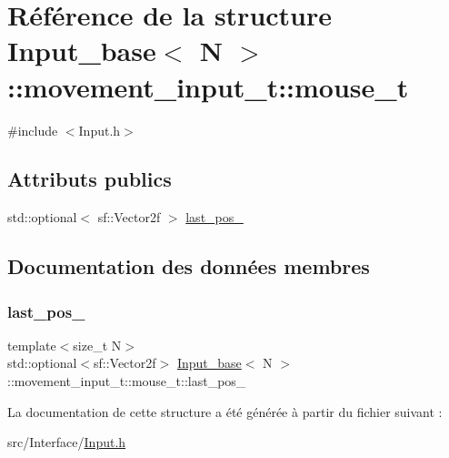 \hypertarget{struct_input__base_1_1movement__input__t_1_1mouse__t}{}\section{Référence de la structure Input\+\_\+base$<$ N $>$\+:\+:movement\+\_\+input\+\_\+t\+:\+:mouse\+\_\+t}
\label{struct_input__base_1_1movement__input__t_1_1mouse__t}


{\ttfamily \#include $<$Input.\+h$>$}

\subsection*{Attributs publics}
\begin{DoxyCompactItemize}
\item 
std\+::optional$<$ sf\+::\+Vector2f $>$ \hyperlink{struct_input__base_1_1movement__input__t_1_1mouse__t_abb22b79e3d13bb8333a5c826cca0888f}{last\+\_\+pos\+\_\+}
\end{DoxyCompactItemize}


\subsection{Documentation des données membres}
\mbox{\label{struct_input__base_1_1movement__input__t_1_1mouse__t_abb22b79e3d13bb8333a5c826cca0888f}} 
\subsubsection{\texorpdfstring{last\+\_\+pos\+\_\+}{last\_pos\_}}
{\footnotesize\ttfamily template$<$size\+\_\+t N$>$ \\
std\+::optional$<$sf\+::\+Vector2f$>$ \hyperlink{class_input__base}{Input\+\_\+base}$<$ N $>$\+::movement\+\_\+input\+\_\+t\+::mouse\+\_\+t\+::last\+\_\+pos\+\_\+}



La documentation de cette structure a été générée à partir du fichier suivant \+:\begin{DoxyCompactItemize}
\item 
src/\+Interface/\hyperlink{_input_8h}{Input.\+h}\end{DoxyCompactItemize}
